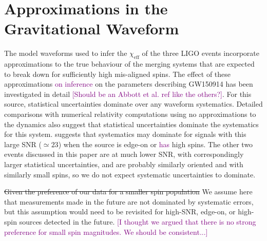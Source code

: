 \documentclass[modern,linenumbers]{aastex61}
\newcommand{\chieff}{\chi_\mathrm{eff}}
\newcommand{\ilya}[1]{\textcolor{purple}{#1}}
\begin{document}
\section{Approximations in the Gravitational Waveform}
The model waveforms used to infer the $\chieff$ of the three LIGO events
incorporate approximations to the true behaviour of the merging
systems that are expected to break down for sufficiently high
mis-aligned spins.  The effect of these approximations \ilya{on inference}  
on the parameters describing
GW150914 has been
investigated in detail \citep{2016arXiv161107531T} \ilya{[Should be an Abbott et al. ref like the others?]}.  For this source, statistical
uncertainties dominate over any waveform systematics.  Detailed
comparisons with numerical relativity computations using no
approximations to the dynamics \citep{2016PhRvD..94f4035A} also
suggest that statistical uncertainties dominate the systematics for
this system.  \citet{2016arXiv161107531T} suggests that systematics
may dominate for signals with this large SNR ($\simeq 23$) when the
source is edge-on or \ilya{has} high spins.  The other two events discussed
in this paper are at much lower SNR, with correspondingly larger
statistical uncertainties, and are probably similarly oriented and
with similarly small spins, so we do not expect systematic
uncertainties to dominate.  

\sout{Given the preference of our data for a smaller spin population} We
assume here that measurements made in the future are not dominated by
systematic errors, but this assumption would need to be revisited for
high-SNR, edge-on, or high-spin sources detected in the future.  \ilya{[I thought we argued that there is no strong preference for small spin magnitudes.  We should be consistent...]}


\end{document}
